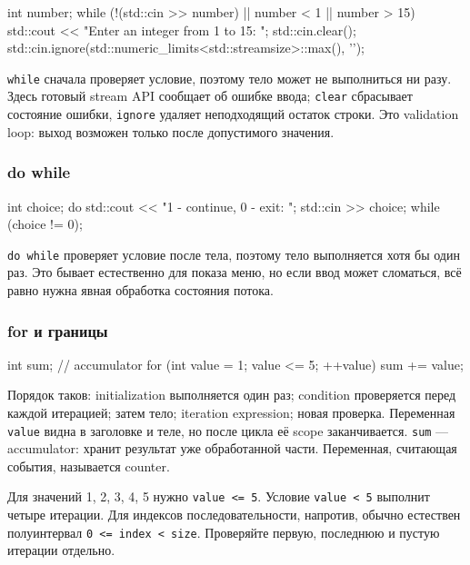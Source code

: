 \begin{cppcode}
int number{};
while (!(std::cin >> number) || number < 1 || number > 15) {
    std::cout << "Enter an integer from 1 to 15: ";
    std::cin.clear();
    std::cin.ignore(std::numeric_limits<std::streamsize>::max(), '\n');
}
\end{cppcode}

\texttt{while} сначала проверяет условие, поэтому тело может не выполниться ни
разу. Здесь готовый stream API сообщает об ошибке ввода; \texttt{clear}
сбрасывает состояние ошибки, \texttt{ignore} удаляет неподходящий остаток
строки. Это validation loop: выход возможен только после допустимого значения.

\subsubsection{do while}

\begin{cppcode}
int choice{};
do {
    std::cout << "1 - continue, 0 - exit: ";
    std::cin >> choice;
} while (choice != 0);
\end{cppcode}

\texttt{do while} проверяет условие после тела, поэтому тело выполняется хотя
бы один раз. Это бывает естественно для показа меню, но если ввод может
сломаться, всё равно нужна явная обработка состояния потока.

\subsubsection{for и границы}

\begin{cppcode}
int sum{};                              // accumulator
for (int value = 1; value <= 5; ++value) {
    sum += value;
}
\end{cppcode}

Порядок таков: initialization выполняется один раз; condition проверяется
перед каждой итерацией; затем тело; iteration expression; новая проверка.
Переменная \texttt{value} видна в заголовке и теле, но после цикла её scope
заканчивается. \texttt{sum} --- accumulator: хранит результат уже обработанной
части. Переменная, считающая события, называется counter.

\begin{mistakebox}
Для значений 1, 2, 3, 4, 5 нужно \texttt{value <= 5}. Условие
\texttt{value < 5} выполнит четыре итерации. Для индексов последовательности,
напротив, обычно естествен полуинтервал \texttt{0 <= index < size}.
Проверяйте первую, последнюю и пустую итерации отдельно.
\end{mistakebox}

